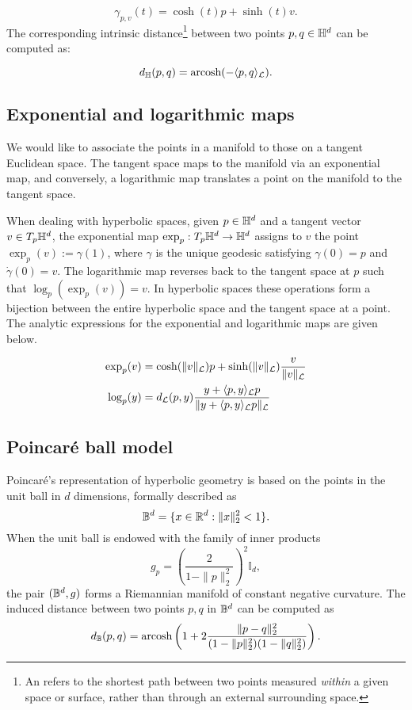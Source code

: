 \begin{equation*}
    \gamma_{p,v}(t) = \cosh(t)p + \sinh(t)v.
\end{equation*}
The corresponding intrinsic distance\footnote{An  refers to the shortest path between two points measured \emph{within} a given space or surface, rather than through an external surrounding space.}  between two points $p,q\in\mathbb{H}^d$ can be computed as:

\begin{equation*}
    d_{\mathbb{H}}(p, q) = \text{arcosh}(-\langle p, q \rangle_{\mathcal{L}}).
\end{equation*}

\subsection{Exponential and logarithmic maps}\label{sec:expLogMaps}
We would like to associate the points in a manifold to those on a tangent Euclidean space. The tangent space maps to the manifold via an exponential map, and conversely, a logarithmic map translates a point on the manifold to the tangent space. 

When dealing with hyperbolic spaces, given $p \in \mathbb{H}^d$ and a tangent vector $v \in T_p\mathbb{H}^d$, the exponential map $\exp_p: T_p\mathbb{H}^d \to \mathbb{H}^d$ assigns to $v$ the point $\exp_p(v) := \gamma(1)$, where $\gamma$ is the unique geodesic satisfying $\gamma(0) = p$ and $\dot{\gamma}(0) = v$. The logarithmic map reverses back to the tangent space at $p$ such that $\log_p(\exp_p(v)) = v$. In hyperbolic spaces these operations form a bijection between the entire hyperbolic space and the tangent space at a point. The analytic expressions for the exponential and logarithmic maps are given below.

\begin{align*}
    \exp_p(v) &= \cosh(\|v\|_{\mathcal{L}})p + \sinh(\|v\|_{\mathcal{L}}) \frac{v}{\|v\|_{\mathcal{L}}}\\
    \log_p(y) &= d_{\mathcal{L}}(p,y)\frac{y + \langle p,y \rangle_{\mathcal{L}}p}{\|y + \langle p,y \rangle_{\mathcal{L}}p\|_{\mathcal{L}}}
\end{align*}

\subsection{Poincaré ball model}\label{sec:poincareBall}
Poincaré's representation of hyperbolic geometry is based on the points in the unit ball in $d$ dimensions, formally described as
\begin{equation*}
    \mathbb{B}^d = \{x \in \mathbb{R}^d: \|x\|^2_2 < 1\}.
\end{equation*}
When the unit ball is endowed with the family of inner products
\begin{equation*}
    g_p = \left(\frac{2}{1-\|p\|^2_2}\right)^2\mathbb{I}_d,
\end{equation*}
the pair $(\mathbb{B}^d,g)$ forms a Riemannian manifold of constant negative curvature. The induced distance between two points $p,q$ in $\mathbb{B}^d$ can be computed as
\begin{equation*}
    d_{\mathbb{B}}(p,q) = \text{arcosh}\left(1 + 2\frac{\|p-q\|^2_2}{(1-\|p\|^2_2)(1-\|q\|^2_2)}\right).
\end{equation*}


